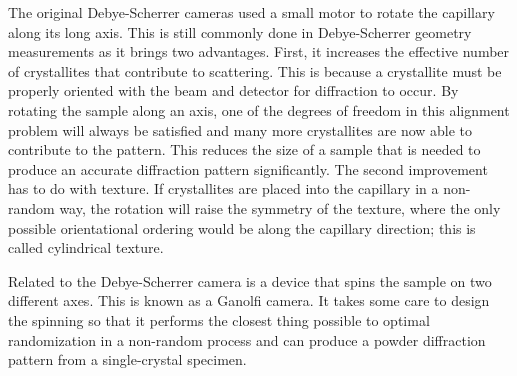 The original Debye-Scherrer cameras used a small motor to rotate the capillary along its long axis. This is still commonly done in Debye-Scherrer geometry measurements as it brings two advantages. First, it increases the effective number of crystallites that contribute to scattering. This is because a crystallite must be properly oriented with the beam and detector for diffraction to occur. By rotating the sample along an axis, one of the degrees of freedom in this alignment problem will always be satisfied and many more crystallites are now able to contribute to the pattern. This reduces the size of a sample that is needed to produce an accurate diffraction pattern significantly. The second improvement has to do with texture. If crystallites are placed into the capillary in a non-random way, the rotation will raise the symmetry of the texture, where the only possible orientational ordering would be along the capillary direction; this is called cylindrical texture. 

Related to the Debye-Scherrer camera is a device that spins the sample on two different axes. This is known as a Ganolfi camera. It takes some care to design the spinning so that it performs the closest thing possible to optimal randomization in a non-random process and can produce a powder diffraction pattern from a single-crystal specimen. 

